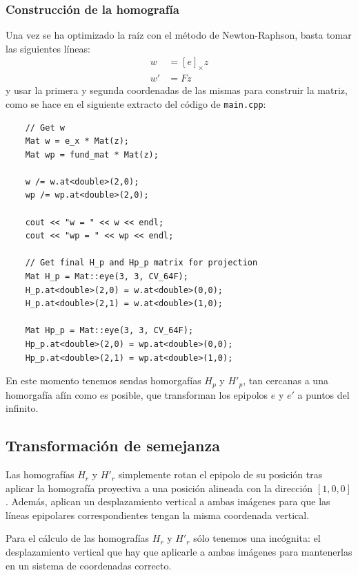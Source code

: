\documentclass[a4paper, 11pt]{article}
\theoremstyle{definition}
\begin{document}
    \subsubsection{Construcción de la homografía}
    Una vez se ha optimizado la raíz con el método de Newton-Raphson, basta tomar las siguientes líneas:
    \begin{align*}
        w &= [e]_\times z \\
        w' &= F z
    \end{align*}
    y usar la primera y segunda coordenadas de las mismas para construir la matriz, como se hace en el siguiente extracto del código de \lstinline{main.cpp}:
    \begin{lstlisting}
    // Get w
    Mat w = e_x * Mat(z);
    Mat wp = fund_mat * Mat(z);

    w /= w.at<double>(2,0);
    wp /= wp.at<double>(2,0);

    cout << "w = " << w << endl;
    cout << "wp = " << wp << endl;

    // Get final H_p and Hp_p matrix for projection
    Mat H_p = Mat::eye(3, 3, CV_64F);
    H_p.at<double>(2,0) = w.at<double>(0,0);
    H_p.at<double>(2,1) = w.at<double>(1,0);

    Mat Hp_p = Mat::eye(3, 3, CV_64F);
    Hp_p.at<double>(2,0) = wp.at<double>(0,0);
    Hp_p.at<double>(2,1) = wp.at<double>(1,0);
    \end{lstlisting}

    En este momento tenemos sendas homorgafías $H_p$ y $H'_p$, tan cercanas a una homorgafía afín como es posible, que transforman los epipolos $e$ y $e'$ a puntos del infinito.

    \subsection{Transformación de semejanza}
    Las homografías $H_r$ y $H'_r$ simplemente rotan el epipolo de su posición tras aplicar la homografía proyectiva a una posición alineada con la dirección $[1, 0, 0]$. Además, aplican un desplazamiento vertical a ambas imágenes para que las líneas epipolares correspondientes tengan la misma coordenada vertical.

    Para el cálculo de las homografías $H_r$ y $H'_r$ sólo tenemos una incógnita: el desplazamiento vertical que hay que aplicarle a ambas imágenes para mantenerlas en un sistema de coordenadas correcto.
\end{document}
